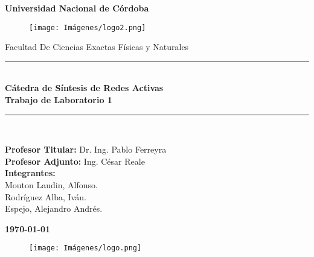 \begin{titlepage}
	
	\begin{center}
		{\LARGE \textbf{Universidad Nacional de Córdoba}}\\
		\begin{figure}[h]
			\centering
			\texttt{[image: Imágenes/logo2.png]}
		\end{figure}
		
		{\large Facultad De Ciencias Exactas Físicas y Naturales}
		
		\rule{\linewidth}{0.3mm}\\
		\vspace{5mm}
		{{\large \textbf{Cátedra de Síntesis de Redes Activas}}}\\
		\vspace{5mm}
		{{\LARGE \textbf{Trabajo de Laboratorio 1}}}
		\rule{\linewidth}{0.3mm}\\
		
		\vspace{10mm}
		
		{\large {\textbf{Profesor Titular:} Dr. Ing. Pablo Ferreyra}\\
        {\textbf{Profesor Adjunto:} Ing. César Reale}\\
		{\textbf{Integrantes:\\} Mouton Laudin, Alfonso.\\Rodríguez Alba, Iván.\\
Espejo, Alejandro Andrés.}\\}
		
		\vspace{10mm}
		
		\textbf{\monthyeardate\today}

        \vspace{10mm}

        \begin{figure}[h]
			\centering
			\texttt{[image: Imágenes/logo.png]}
		\end{figure}
		
	\end{center}
	

\end{titlepage}
